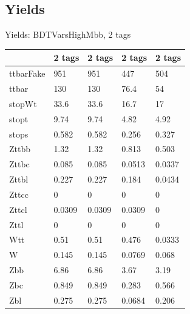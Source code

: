 
\subsection{Yields}

\begin{frame}{Yields: BDTVarsHighMbb, 2 tags}
\begin{center}
  \begin{tabular}{l| >{\centering\let\newline\\\arraybackslash\hspace{0pt}}m{1.4cm}| >{\centering\let\newline\\\arraybackslash\hspace{0pt}}m{1.4cm}| >{\centering\let\newline\\\arraybackslash\hspace{0pt}}m{1.4cm}| >{\centering\let\newline\\\arraybackslash\hspace{0pt}}m{1.4cm}}
    & 2 tags & 2 tags & 2 tags & 2 tags \\
 \hline \hline
    ttbarFake& 951 & 951 & 447 & 504 \\
 \hline
    ttbar& 130 & 130 & 76.4 & 54 \\
 \hline
    stopWt& 33.6 & 33.6 & 16.7 & 17 \\
 \hline
    stopt& 9.74 & 9.74 & 4.82 & 4.92 \\
 \hline
    stops& 0.582 & 0.582 & 0.256 & 0.327 \\
 \hline
    Zttbb& 1.32 & 1.32 & 0.813 & 0.503 \\
 \hline
    Zttbc& 0.085 & 0.085 & 0.0513 & 0.0337 \\
 \hline
    Zttbl& 0.227 & 0.227 & 0.184 & 0.0434 \\
 \hline
    Zttcc& 0 & 0 & 0 & 0 \\
 \hline
    Zttcl& 0.0309 & 0.0309 & 0.0309 & 0 \\
 \hline
    Zttl& 0 & 0 & 0 & 0 \\
 \hline
    Wtt& 0.51 & 0.51 & 0.476 & 0.0333 \\
 \hline
    W& 0.145 & 0.145 & 0.0769 & 0.068 \\
 \hline
    Zbb& 6.86 & 6.86 & 3.67 & 3.19 \\
 \hline
    Zbc& 0.849 & 0.849 & 0.283 & 0.566 \\
 \hline
    Zbl& 0.275 & 0.275 & 0.0684 & 0.206 \\

\end{tabular}
\end{center}
\end{frame}
